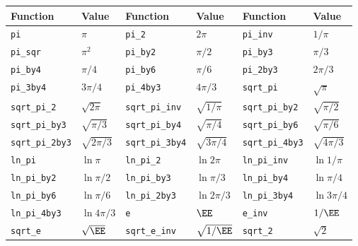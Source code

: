 \documentclass[11pt,bib,mint,hyper,altcolor]{marticle}
\begin{document}
\begin{table}[t]
  \begin{tabu}{X[2l]X[l]X[2l]X[l]X[2l]X[l]}
    \toprule
    Function & Value &
    Function & Value &
    Function & Value \\
    \midrule
    \texttt{pi}             & $\pi$              &
    \texttt{pi\_2}          & $2\pi$             &
    \texttt{pi\_inv}        & $1/\pi$            \\
    \texttt{pi\_sqr}        & $\pi^2$            &
    \texttt{pi\_by2}        & $\pi/2$            &
    \texttt{pi\_by3}        & $\pi/3$            \\
    \texttt{pi\_by4}        & $\pi/4$            &
    \texttt{pi\_by6}        & $\pi/6$            &
    \texttt{pi\_2by3}       & $2\pi/3$           \\
    \texttt{pi\_3by4}       & $3\pi/4$           &
    \texttt{pi\_4by3}       & $4\pi/3$           &
    \texttt{sqrt\_pi}       & $\sqrt{\pi}$       \\
    \texttt{sqrt\_pi\_2}    & $\sqrt{2\pi}$      &
    \texttt{sqrt\_pi\_inv}  & $\sqrt{1/\pi}$     &
    \texttt{sqrt\_pi\_by2}  & $\sqrt{\pi/2}$     \\
    \texttt{sqrt\_pi\_by3}  & $\sqrt{\pi/3}$     &
    \texttt{sqrt\_pi\_by4}  & $\sqrt{\pi/4}$     &
    \texttt{sqrt\_pi\_by6}  & $\sqrt{\pi/6}$     \\
    \texttt{sqrt\_pi\_2by3} & $\sqrt{2\pi/3}$    &
    \texttt{sqrt\_pi\_3by4} & $\sqrt{3\pi/4}$    &
    \texttt{sqrt\_pi\_4by3} & $\sqrt{4\pi/3}$    \\
    \texttt{ln\_pi}         & $\ln{\pi}$         &
    \texttt{ln\_pi\_2}      & $\ln{2\pi}$        &
    \texttt{ln\_pi\_inv}    & $\ln{1/\pi}$       \\
    \texttt{ln\_pi\_by2}    & $\ln{\pi/2}$       &
    \texttt{ln\_pi\_by3}    & $\ln{\pi/3}$       &
    \texttt{ln\_pi\_by4}    & $\ln{\pi/4}$       \\
    \texttt{ln\_pi\_by6}    & $\ln{\pi/6}$       &
    \texttt{ln\_pi\_2by3}   & $\ln{2\pi/3}$      &
    \texttt{ln\_pi\_3by4}   & $\ln{3\pi/4}$      \\
    \texttt{ln\_pi\_4by3}   & $\ln{4\pi/3}$      &
    \texttt{e}              & $\EE$              &
    \texttt{e\_inv}         & $1/\EE$            \\
    \texttt{sqrt\_e}        & $\sqrt{\EE}$       &
    \texttt{sqrt\_e\_inv}   & $\sqrt{1/\EE}$     &
    \texttt{sqrt\_2}        & $\sqrt{2}$         \\

\end{tabu}
\end{table}
\end{document}
